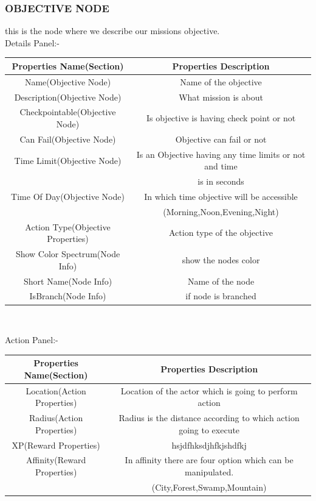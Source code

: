 \documentclass[12pt]{article}
\begin{document}
	  \subsubsection{OBJECTIVE NODE}
	  this is the node where we describe our missions objective.\\
	  Details Panel:-
	  	\begin{center}
	  		\begin{tabular}{|c|c|}\hline
				Properties Name(Section)&Properties Description\\\hline\hline	 Name(Objective Node) & Name of the objective\\\hline
				Description(Objective Node)& What mission is about\\\hline
				Checkpointable(Objective Node)& Is objective is having check point or not\\\hline
				Can Fail(Objective Node) & Objective can fail or not\\\hline
				Time Limit(Objective Node) & Is an Objective having any time limits or not and time\\ 
				&is in seconds\\\hline
				Time Of Day(Objective Node) & In which time objective will be accessible\\
				& (Morning,Noon,Evening,Night)\\\hline
				Action Type(Objective Properties)& Action type of the objective\\\hline
					Show Color Spectrum(Node Info) & show the nodes 					color\\\hline
			Short Name(Node Info) & Name of the node\\\hline
			IsBranch(Node Info) & if node is branched\\\hline				
	  		\end{tabular}\\
	  	\end{center}
	  		Action Panel:-	
	  \begin{center}
	  	\begin{tabular}{|c|c|}\hline
	  	Properties Name(Section)& Properties Description\\\hline\hline
	  	Location(Action Properties)&Location of the actor which is going to perform action\\\hline
	  	Radius(Action Properties)& Radius is the distance according to which action going to execute\\\hline 
	  	XP(Reward Properties)& hsjdfhksdjhfkjshdfkj\\\hline
	  	Affinity(Reward Properties)& In affinity there are four option which can be manipulated.\\
	  	& (City,Forest,Swamp,Mountain)\\\hline
	  		  		
	  	\end{tabular}
	  \end{center}
	  \pagebreak
\end{document}
